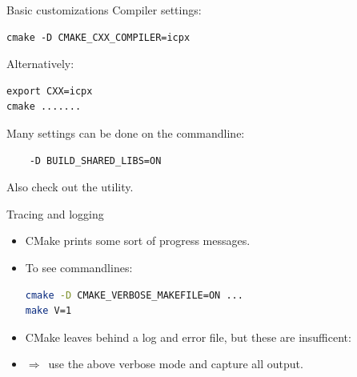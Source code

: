 
\begin{numberedframe}{Basic customizations}
  Compiler settings:
\begin{lstlisting}
cmake -D CMAKE_CXX_COMPILER=icpx
\end{lstlisting}
Alternatively:
\begin{lstlisting}
export CXX=icpx
cmake .......
\end{lstlisting}
Many settings can be done on the commandline:
\begin{lstlisting}
    -D BUILD_SHARED_LIBS=ON
\end{lstlisting}
Also check out the  utility.
\end{numberedframe}

\begin{numberedframe}{Tracing and logging}
  \begin{itemize}
  \item CMake prints some sort of progress messages.
  \item To see commandlines:
\begin{lstlisting}[language=bash]
cmake -D CMAKE_VERBOSE_MAKEFILE=ON ...
make V=1
\end{lstlisting}
\item CMake leaves behind a log and error file, but these are insufficent:
  \item $\Rightarrow$~use the above verbose mode and capture all output.
  \end{itemize}
\end{numberedframe}
